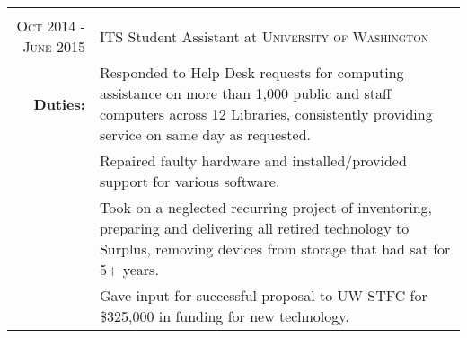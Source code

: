 \documentclass[a4paper,10pt]{article}
\begin{document}
\begin{tabular}{r|p{14cm}}
	\multicolumn{2}{c}{}\\
\textsc{Oct 2014 - June 2015} & ITS Student Assistant at \textsc{University of Washington}\\
	\textbf{Duties:} & \footnotesize{\textbullet Responded to Help Desk requests for computing assistance on more than 1,000 public and staff computers across 12 Libraries, consistently providing service on same day as requested.}\\
	& \footnotesize{\textbullet Repaired faulty hardware and installed/provided support for various software.}\\
	& \footnotesize{\textbullet Took on a neglected recurring project of inventoring, preparing and delivering all retired technology to Surplus, removing devices from storage that had sat for 5+ years. }\\
	& \footnotesize{\textbullet Gave input for successful proposal to UW STFC for \$325,000 in funding for new technology.}
\end{tabular}

\end{document}
